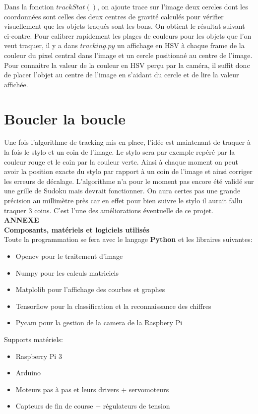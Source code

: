 \documentclass[12pt]{article}
\begin{document}
 Dans la fonction $trackStat()$, on ajoute trace sur l'image deux cercles dont les coordonnées sont celles des deux centres de gravité calculés pour vérifier visuellement que les objets traqués sont les bons. On obtient le résultat suivant ci-contre.
Pour calibrer rapidement les plages de couleurs pour les objets que l'on veut traquer, il y a dans $tracking.py$ un affichage en HSV à chaque frame de la couleur du pixel central dans l'image et un cercle positionné au centre de l'image. Pour connaitre la valeur de la couleur en HSV perçu par la caméra, il suffit donc de placer l'objet au centre de l'image en s'aidant du cercle et de lire la valeur affichée.

\section{Boucler la boucle}

Une fois l'algorithme de tracking mis en place, l'idée est maintenant de traquer à la fois le stylo et un coin de l'image. Le stylo sera par exemple repéré par la couleur rouge et le coin par la couleur verte. Ainsi à chaque moment on peut avoir la position exacte du stylo par rapport à un coin de l'image et ainsi corriger les erreurs de décalage. L'algorithme n'a pour le moment pas encore été validé sur une grille de Sudoku mais devrait fonctionner. On aura certes pas une grande précision au millimètre près car en effet pour bien suivre le stylo il aurait fallu traquer 3 coins. C'est l'une des améliorations éventuelle de ce projet.\\

\newpage
\textbf{ANNEXE}\\


\noindent
\textbf{Composants, matériels et logiciels utilisés}\\
Toute la programmation se fera avec le langage \textbf{Python} et les libraires suivantes:
\begin{itemize}
\item{Opencv} pour le traitement d'image
\item{Numpy} pour les calculs matriciels
\item{Matplolib} pour l'affichage des courbes et graphes
\item{Tensorflow} pour la classification et la reconnaissance des chiffres
\item{Pycam} pour la gestion de la camera de la Raspbery Pi
\end{itemize}

\noindent
Supports matériels:
\begin{itemize}
\item{Raspberry Pi 3}
\item{Arduino}
\item{Moteurs pas à pas et leurs drivers + servomoteurs}
\item{Capteurs de fin de course + régulateurs de tension}
\end{itemize}
\end{document}
